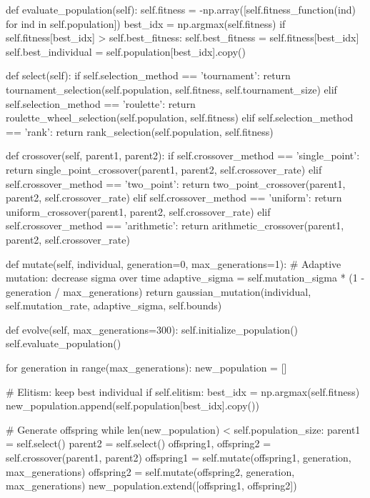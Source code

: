 \documentclass[a4paper, 11pt]{article}
\begin{document}
\begin{pycode}
    def evaluate_population(self):
        self.fitness = -np.array([self.fitness_function(ind) for ind in self.population])
        best_idx = np.argmax(self.fitness)
        if self.fitness[best_idx] > self.best_fitness:
            self.best_fitness = self.fitness[best_idx]
            self.best_individual = self.population[best_idx].copy()

    def select(self):
        if self.selection_method == 'tournament':
            return tournament_selection(self.population, self.fitness, self.tournament_size)
        elif self.selection_method == 'roulette':
            return roulette_wheel_selection(self.population, self.fitness)
        elif self.selection_method == 'rank':
            return rank_selection(self.population, self.fitness)

    def crossover(self, parent1, parent2):
        if self.crossover_method == 'single_point':
            return single_point_crossover(parent1, parent2, self.crossover_rate)
        elif self.crossover_method == 'two_point':
            return two_point_crossover(parent1, parent2, self.crossover_rate)
        elif self.crossover_method == 'uniform':
            return uniform_crossover(parent1, parent2, self.crossover_rate)
        elif self.crossover_method == 'arithmetic':
            return arithmetic_crossover(parent1, parent2, self.crossover_rate)

    def mutate(self, individual, generation=0, max_generations=1):
        # Adaptive mutation: decrease sigma over time
        adaptive_sigma = self.mutation_sigma * (1 - generation / max_generations)
        return gaussian_mutation(individual, self.mutation_rate,
                                adaptive_sigma, self.bounds)

    def evolve(self, max_generations=300):
        self.initialize_population()
        self.evaluate_population()

        for generation in range(max_generations):
            new_population = []

            # Elitism: keep best individual
            if self.elitism:
                best_idx = np.argmax(self.fitness)
                new_population.append(self.population[best_idx].copy())

            # Generate offspring
            while len(new_population) < self.population_size:
                parent1 = self.select()
                parent2 = self.select()
                offspring1, offspring2 = self.crossover(parent1, parent2)
                offspring1 = self.mutate(offspring1, generation, max_generations)
                offspring2 = self.mutate(offspring2, generation, max_generations)
                new_population.extend([offspring1, offspring2])


\end{pycode}
\end{document}
